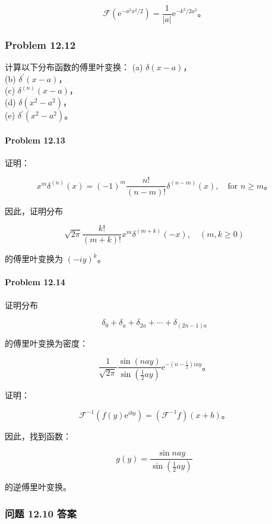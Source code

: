 \[
\mathcal{F}\left(\mathrm{e}^{-a^{2} x^{2} / 2}\right) = \frac{1}{|a|} \mathrm{e}^{-k^{2} / 2 a^{2}}。
\]

\subsubsection{Problem 12.12}\label{problem-12.12}

计算以下分布函数的傅里叶变换： (a) \(\delta(x-a)\)，\\
(b) \(\delta^{\prime}(x-a)\)，\\
(c) \(\delta^{(n)}(x-a)\)，\\
(d) \(\delta\left(x^{2}-a^{2}\right)\)，\\
(e) \(\delta^{\prime}\left(x^{2}-a^{2}\right)\)。

\paragraph{Problem 12.13}\label{problem-12.13}

证明：

\[
x^{m} \delta^{(n)}(x) = (-1)^{m} \frac{n!}{(n-m)!} \delta^{(n-m)}(x), \quad \text{for } n \geq m。
\]

因此，证明分布

\[
\sqrt{2 \pi} \frac{k!}{(m+k)!} x^{m} \delta^{(m+k)}(-x), \quad (m, k \geq 0)
\]

的傅里叶变换为 \((-i y)^{k}\)。

\paragraph{Problem 12.14}\label{problem-12.14}

证明分布

\[
\delta_{0} + \delta_{a} + \delta_{2 a} + \cdots + \delta_{(2 n-1) a}
\]

的傅里叶变换为密度：

\[
\frac{1}{\sqrt{2 \pi}} \frac{\sin (n a y)}{\sin \left(\frac{1}{2} a y\right)} \mathrm{e}^{-\left(n-\frac{1}{2}\right) i a y}。
\]

证明：

\[
\mathcal{F}^{-1}\left(f(y) \mathrm{e}^{i b y}\right) = \left(\mathcal{F}^{-1} f\right)(x+b)。
\]

因此，找到函数：

\[
g(y) = \frac{\sin n a y}{\sin \left(\frac{1}{2} a y\right)}
\]

的逆傅里叶变换。

\subsubsection{问题 12.10 答案}\label{ux95eeux9898-12.10-ux7b54ux6848}

